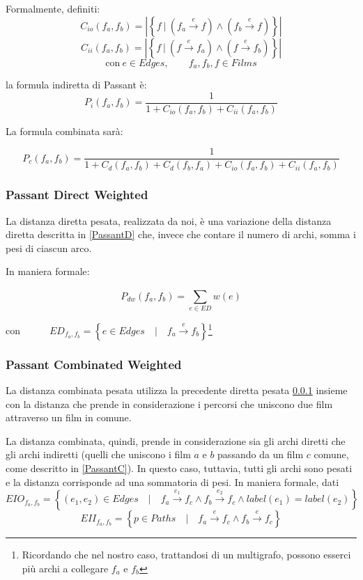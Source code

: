 Formalmente, definiti:
$$C_{io}(f_a,f_b) = \left\vert \left\{ f \  | \  (f_a \xrightarrow{~e~} f ) \wedge (f_b \xrightarrow{~e~} f) \right\} \right\vert$$
$$C_{ii}(f_a,f_b) = \left\vert \left\{ f \  | \  ( f \xrightarrow{~e~} f_a ) \wedge ( f \xrightarrow{~e~} f_b) \right\} \right\vert$$
$$\text{con} \ e \in Edges  , \qquad f_a,f_b,f \in Films $$

la formula indiretta di Passant è:
    \begin{equation}
        P_i(f_{a},f_{b}) = \frac{1} {1+C_{io}(f_{a},f_{b})+C_{ii}(f_{a},f_{b})}
    \end{equation}

La formula combinata sarà:

    \begin{equation}
P_{c}(f_{a},f_{b}) = \frac{1} {1+C_{d}(f_{a},f_{b})+C_{d}(f_{b},f_{a})+C_{io}(f_{a},f_{b})+C_{ii}(f_{a},f_{b})}
    \end{equation}


\subsubsection{Passant Direct Weighted}
\label{PassantDW}
La distanza diretta pesata, realizzata da noi, è una variazione della distanza diretta descritta in \ref{PassantD} che, invece che contare il numero di archi, somma i pesi di ciascun arco.

In maniera formale:

\begin{equation}
P_{dw}(f_a,f_b) = \sum\limits_{e \in ED}^{}{w(e)}
\end{equation}

con~~$ \qquad ED_{f_a,f_b} = \left\{ e \in Edges \quad\big\vert\quad f_a \xrightarrow{~e~} f_b \right\}$\footnote{Ricordando che nel nostro caso, trattandosi di un multigrafo, possono esserci più archi a collegare $f_a$ e $f_b$}

\subsubsection{Passant Combinated Weighted}
La distanza combinata pesata utilizza la precedente diretta pesata
\ref{PassantDW} insieme con la distanza che prende in considerazione i percorsi che uniscono due film attraverso un film in comune.

La distanza combinata, quindi, prende in considerazione sia gli archi diretti che gli archi indiretti (quelli che uniscono i film $a$ e $b$ passando da un film $c$ comune, come descritto in \ref{PassantC}). In questo caso, tuttavia, tutti gli archi sono pesati e la distanza corrisponde ad una sommatoria di pesi. In maniera formale, dati
$$EIO_{f_a,f_b} = \left\{ (e_1, e_2) \in Edges \quad\big\vert\quad f_a \xrightarrow{e_1} f_c \wedge f_b \xrightarrow{e_2} f_c \wedge label(e_1)=label(e_2) \right\}$$
$$EII_{f_a,f_b} = \left\{ p \in Paths \quad\big\vert\quad f_a \xrightarrow{e} f_c \wedge f_b \xrightarrow{e} f_c \right\}$$

